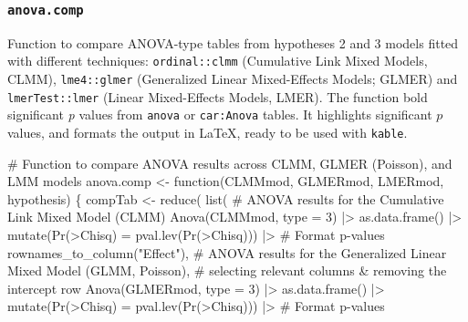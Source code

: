\documentclass[
  bookmarksnumbered]{article}
\newenvironment{Shaded}{\begin{snugshade}}{\end{snugshade}}
\newcommand{\AttributeTok}[1]{\textcolor[rgb]{0.80,0.80,0.80}{#1}}
\newcommand{\CommentTok}[1]{\textcolor[rgb]{0.50,0.62,0.50}{#1}}
\newcommand{\ControlFlowTok}[1]{\textcolor[rgb]{0.94,0.87,0.69}{#1}}
\newcommand{\DecValTok}[1]{\textcolor[rgb]{0.86,0.86,0.80}{#1}}
\newcommand{\FunctionTok}[1]{\textcolor[rgb]{0.94,0.94,0.56}{#1}}
\newcommand{\NormalTok}[1]{\textcolor[rgb]{0.80,0.80,0.80}{#1}}
\newcommand{\OtherTok}[1]{\textcolor[rgb]{0.94,0.94,0.56}{#1}}
\newcommand{\SpecialCharTok}[1]{\textcolor[rgb]{0.86,0.64,0.64}{#1}}
\newcommand{\StringTok}[1]{\textcolor[rgb]{0.80,0.58,0.58}{#1}}
\begin{document}
\subsubsection{\texorpdfstring{\texttt{anova.comp}}{anova.comp}}\label{anova.comp}

Function to compare ANOVA-type tables from hypotheses 2 and 3 models fitted with different techniques: \texttt{ordinal::clmm} (Cumulative Link Mixed Models, CLMM), \texttt{lme4::glmer} (Generalized Linear Mixed-Effects Models; GLMER) and \texttt{lmerTest::lmer} (Linear Mixed-Effects Models, LMER). The function bold significant \emph{p} values from \texttt{anova} or \texttt{car:Anova} tables. It highlights significant \(p\) values, and formats the output in \LaTeX, ready to be used with \texttt{kable}.

\begin{Shaded}
\begin{Highlighting}[]
\CommentTok{\# Function to compare ANOVA results across CLMM, GLMER (Poisson), and LMM models}
\NormalTok{anova.comp }\OtherTok{\textless{}{-}} \ControlFlowTok{function}\NormalTok{(CLMMmod, GLMERmod, LMERmod, hypothesis) \{}
\NormalTok{  compTab }\OtherTok{\textless{}{-}}
    \FunctionTok{reduce}\NormalTok{(}
      \FunctionTok{list}\NormalTok{(}
        \CommentTok{\# ANOVA results for the Cumulative Link Mixed Model (CLMM)}
        \FunctionTok{Anova}\NormalTok{(CLMMmod, }\AttributeTok{type =} \DecValTok{3}\NormalTok{) }\SpecialCharTok{|\textgreater{}}
          \FunctionTok{as.data.frame}\NormalTok{() }\SpecialCharTok{|\textgreater{}}
          \FunctionTok{mutate}\NormalTok{(}\StringTok{\textasciigrave{}}\AttributeTok{Pr(\textgreater{}Chisq)}\StringTok{\textasciigrave{}} \OtherTok{=} \FunctionTok{pval.lev}\NormalTok{(}\StringTok{\textasciigrave{}}\AttributeTok{Pr(\textgreater{}Chisq)}\StringTok{\textasciigrave{}}\NormalTok{)) }\SpecialCharTok{|\textgreater{}} \CommentTok{\# Format p{-}values}
          \FunctionTok{rownames\_to\_column}\NormalTok{(}\StringTok{"Effect"}\NormalTok{),}
        \CommentTok{\# ANOVA results for the Generalized Linear Mixed Model (GLMM, Poisson),}
        \CommentTok{\# selecting relevant columns \& removing the intercept row}
        \FunctionTok{Anova}\NormalTok{(GLMERmod, }\AttributeTok{type =} \DecValTok{3}\NormalTok{) }\SpecialCharTok{|\textgreater{}}
          \FunctionTok{as.data.frame}\NormalTok{() }\SpecialCharTok{|\textgreater{}}
          \FunctionTok{mutate}\NormalTok{(}\StringTok{\textasciigrave{}}\AttributeTok{Pr(\textgreater{}Chisq)}\StringTok{\textasciigrave{}} \OtherTok{=} \FunctionTok{pval.lev}\NormalTok{(}\StringTok{\textasciigrave{}}\AttributeTok{Pr(\textgreater{}Chisq)}\StringTok{\textasciigrave{}}\NormalTok{)) }\SpecialCharTok{|\textgreater{}} \CommentTok{\# Format p{-}values}

\end{Highlighting}
\end{Shaded}
\end{document}
